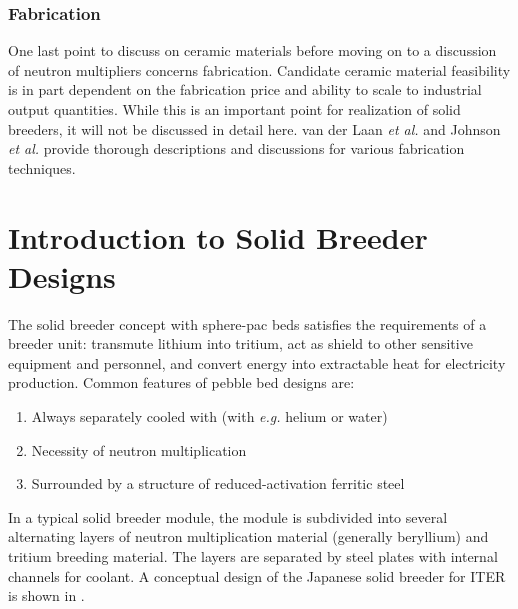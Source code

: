 \documentclass[11pt]{report} %
\begin{document}
\subsection{Fabrication}
One last point to discuss on ceramic materials before moving on to a discussion of neutron multipliers concerns fabrication. Candidate ceramic material feasibility is in part dependent on the fabrication price and ability to scale to industrial output quantities. While this is an important point for realization of solid breeders, it will not be discussed in detail here. van der Laan \textit{et al.}\cite{vanderLaan200099} and Johnson \textit{et al.}\cite{Johnson1991} provide thorough descriptions and discussions for various fabrication techniques.



































\chapter{Introduction to Solid Breeder Designs}
The solid breeder concept with sphere-pac beds satisfies the requirements of a breeder unit: transmute lithium into tritium, act as shield to other sensitive equipment and personnel, and convert energy into extractable heat for electricity production. Common features of pebble bed designs are:
\begin{enumerate}
\item{Always separately cooled with (with \textit{e.g.} helium or water)}
\item{Necessity of neutron multiplication}
\item{Surrounded by a structure of reduced-activation ferritic steel}
\end{enumerate}
In a typical solid breeder module, the module is subdivided into several alternating layers of neutron multiplication material (generally beryllium) and tritium breeding material. The layers are separated by steel plates with internal channels for coolant. A conceptual design of the Japanese solid breeder for ITER is shown in .
\end{document}
